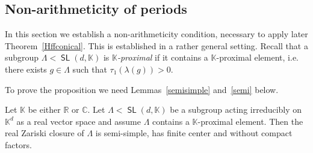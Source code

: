 \documentclass[AHL,Unicode,longabstracts,MathTools]{cedram}
\makeatletter
\DeclareMathOperator{\SL}{{\mathsf{SL}}}
\newcommand{\R}{\mathbb{R}}
\newcommand{\C}{\mathbb{C}}
\renewcommand{\H}{\mathbb{H}}
\newcommand{\K}{\mathbb{K}}
\newcommand{\g}{\gamma}
\newcommand{\grupo}{\varLambda}
\newcommand{\slroot}{{\tau}}
\newcommand{\ov}{\overline}
\newcommand{\ovrho}{\overline{\!\rho}}
\newcommand{\ovsloot}
{\bar{\slroot}}
\newcommand{\ovd}{\bar{d}}
\renewcommand{\/}{\backslash}
\newcommand{\<}{\langle}
\renewcommand{\>}{\rangle}
\let\save@mathaccent\mathaccent
\newcommand*\if@single[3]{%
  \setbox0\hbox{${\mathaccent"0362{#1}}^H$}%
  \setbox2\hbox{${\mathaccent"0362{\kern0pt#1}}^H$}%
  \ifdim\ht0=\ht2 #3\else #2\fi
  }
\newcommand*\rel@kern[1]{\kern#1\dimexpr\macc@kerna}
\newcommand*\widebar[1]{\@ifnextchar^{{\wide@bar{#1}{0}}}{\wide@bar{#1}{1}}}
\newcommand*\wide@bar[2]{\if@single{#1}{\wide@bar@{#1}{#2}{1}}{\wide@bar@{#1}{#2}{2}}}
\newcommand*\wide@bar@[3]{%
  \begingroup
  \def\mathaccent##1##2{%
    \let\mathaccent\save@mathaccent
    \if#32 \let\macc@nucleus\first@char \fi
    \setbox\z@\hbox{$\macc@style{\macc@nucleus}_{}$}%
    \setbox\tw@\hbox{$\macc@style{\macc@nucleus}{}_{}$}%
    \dimen@\wd\tw@
    \advance\dimen@-\wd\z@
    \divide\dimen@ 3
    \@tempdima\wd\tw@
    \advance\@tempdima-\scriptspace
    \divide\@tempdima 10
    \advance\dimen@-\@tempdima
    \ifdim\dimen@>\z@ \dimen@0pt\fi
    \rel@kern{0.6}\kern-\dimen@
    \if#31
      \overline{\rel@kern{-0.6}\kern\dimen@\macc@nucleus\rel@kern{0.4}\kern\dimen@}%
      \advance\dimen@0.4\dimexpr\macc@kerna
      \let\final@kern#2%
      \ifdim\dimen@<\z@ \let\final@kern1\fi
      \if\final@kern1 \kern-\dimen@\fi
    \else
      \overline{\rel@kern{-0.6}\kern\dimen@#1}%
    \fi
  }%
  \macc@depth\@ne
  \let\math@bgroup\@empty \let\math@egroup\macc@set@skewchar
  \mathsurround\z@ \frozen@everymath{\mathgroup\macc@group\relax}%
  \macc@set@skewchar\relax
  \let\mathaccentV\macc@nested@a
  \if#31
    \macc@nested@a\relax111{#1}%
  \else
    \def\gobble@till@marker##1\endmarker{}%
    \futurelet\first@char\gobble@till@marker#1\endmarker
    \ifcat\noexpand\first@char A\else
      \def\first@char{}%
    \fi
    \macc@nested@a\relax111{\first@char}%
  \fi
  \endgroup
}
\let\oldbar\bar
\renewcommand*{\bar}[1]{{\mathchoice{\widebar{#1}}{\widebar{#1}}{\widebar{#1}}{\oldbar{#1}}}}
\renewcommand*{\to}{\mathchoice{\longrightarrow}{\rightarrow}{\rightarrow}{\rightarrow}}
\makeatother
\begin{document}
\subsection{Non-arithmeticity of periods}



In this section we establish a non-arithme\-ti\-ci\-ty condition, necessary to apply later Theorem~\ref{Hffconical}. This is established in a rather general setting. Recall that a subgroup $\grupo<\SL(d,\K)$ is \emph{$\K$-proximal} if it contains a $\K$-proximal element, i.e. there exists $g\in\grupo$ such that $\slroot_1(\lambda(g))>0$.



To prove the proposition we need Lemmas~\ref{semisimple} and~\ref{semi} below.


\begin{lemm}\label{semisimple}
Let $\K$ be either $\R$ or $\C$. Let $\grupo<\SL(d,\K)$ be a subgroup acting irreducibly on $\K^d$ as a real vector space and assume $\grupo$ contains a $\K$-proximal element. Then the real Zariski closure of $\grupo$ is semi-simple, has finite center and without compact factors.
\end{lemm}
\end{document}
